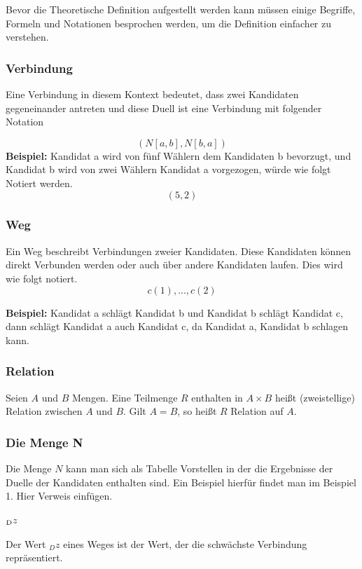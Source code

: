 Bevor die Theoretische Definition aufgestellt werden kann müssen einige Begriffe, Formeln und Notationen besprochen werden, um die Definition einfacher zu verstehen.


\subsubsection{Verbindung}
\label{verbindung}
Eine Verbindung in diesem Kontext bedeutet, dass zwei Kandidaten gegeneinander antreten und diese Duell ist eine Verbindung mit folgender Notation

\[
(N[a,b],N[b,a])
\]
\textbf{Beispiel:}
Kandidat a wird von fünf Wählern dem Kandidaten b bevorzugt, und Kandidat b wird von zwei Wählern Kandidat a vorgezogen, würde wie folgt Notiert werden. 
\[
(5,2)
\]

\subsubsection{Weg}
\label{weg}
Ein Weg beschreibt Verbindungen zweier Kandidaten. Diese Kandidaten können direkt Verbunden werden oder auch über andere Kandidaten laufen. Dies wird wie folgt notiert.
\[
c(1),...,c(2)
\]

\textbf{Beispiel:} Kandidat a schlägt Kandidat b und Kandidat b schlägt Kandidat c, dann schlägt Kandidat a auch Kandidat c, da Kandidat a, Kandidat b schlagen kann.

\subsubsection{Relation}
\label{relation}
\glqq Seien $A$ und $B$ Mengen. Eine Teilmenge $R$ enthalten in $A \times B$ heißt (zweistellige) Relation zwischen $A$ und $B$. Gilt $A = B$, so heißt $R$ Relation auf $A$.\grqq \citep{Lang2018}


\subsubsection{Die Menge N}
\label{mengeN}
Die Menge $N$ kann man sich als Tabelle Vorstellen in der die Ergebnisse der Duelle der Kandidaten enthalten sind. Ein Beispiel hierfür findet man im Beispiel 1. Hier Verweis einfügen.


\subsubsection{$\textsubscript{D}z$}
\label{dz}
Der Wert $_{D}z$ eines Weges ist der Wert, der die schwächste Verbindung repräsentiert.

